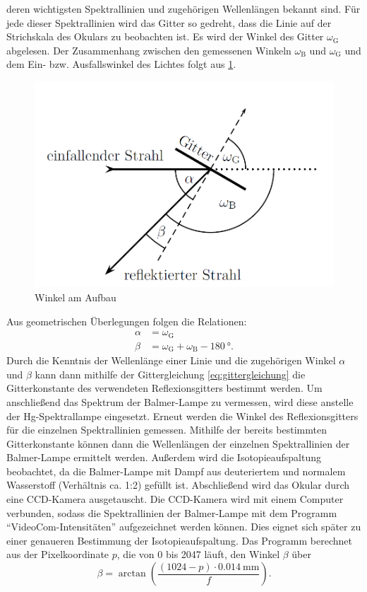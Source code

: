 deren wichtigsten Spektrallinien und zugehörigen Wellenlängen bekannt sind. Für jede dieser Spektrallinien wird das Gitter so gedreht, dass die Linie auf der Strichskala
des Okulars zu beobachten ist. Es wird der Winkel des Gitter $\omega_{\mathrm{G}}$ abgelesen. Der Zusammenhang zwischen den gemessenen Winkeln $\omega_{\mathrm{B}}$ und $\omega_{\mathrm{G}}$
und dem Ein- bzw. Ausfallswinkel des Lichtes folgt aus \cref{fig:winkel_am_aufbau}.
\begin{figure}[H]
	\centering
	\includegraphics[width=0.5\linewidth]{../figs/winkel_am_aufbau.png}
	\caption{Winkel am Aufbau \cite{skript}}
	\label{fig:winkel_am_aufbau}
\end{figure} Aus geometrischen Überlegungen folgen die Relationen:
\begin{align}\label{eq:winkel}
    \alpha &= \omega_{\mathrm{G}} \\
    \beta &= \omega_{\mathrm{G}} + \omega_{\mathrm{B}} - \SI{180}{\degree} .
\end{align} Durch die Kenntnis der Wellenlänge einer Linie und die zugehörigen Winkel $\alpha$ und $\beta$ kann dann mithilfe der Gittergleichung \ref{eq:gittergleichung}
die Gitterkonstante des verwendeten Reflexionsgitters bestimmt werden. Um anschließend das Spektrum der Balmer-Lampe zu vermessen, wird diese anstelle der Hg-Spektrallampe eingesetzt.
Erneut werden die Winkel des Reflexionsgitters für die einzelnen Spektrallinien gemessen. Mithilfe der bereits bestimmten Gitterkonstante können dann die Wellenlängen der
einzelnen Spektrallinien der Balmer-Lampe ermittelt werden. Außerdem wird die Isotopieaufspaltung beobachtet, da die Balmer-Lampe mit Dampf aus deuteriertem und normalem Wasserstoff
(Verhältnis  ca. 1:2) gefüllt ist. Abschließend wird das Okular durch eine CCD-Kamera ausgetauscht. Die CCD-Kamera wird mit einem Computer verbunden, sodass die
Spektrallinien der Balmer-Lampe mit dem Programm \enquote{VideoCom-Intensitäten} aufgezeichnet werden können. Dies eignet sich später zu einer genaueren Bestimmung
der Isotopieaufspaltung. Das Programm berechnet aus der Pixelkoordinate $p$, die von 0 bis 2047 läuft, den Winkel $\beta$ über
\begin{equation*}
    \beta = \arctan(\frac{(1024 - p) \cdot \SI{0,014}{\milli \meter}}{f}) .
\end{equation*}

